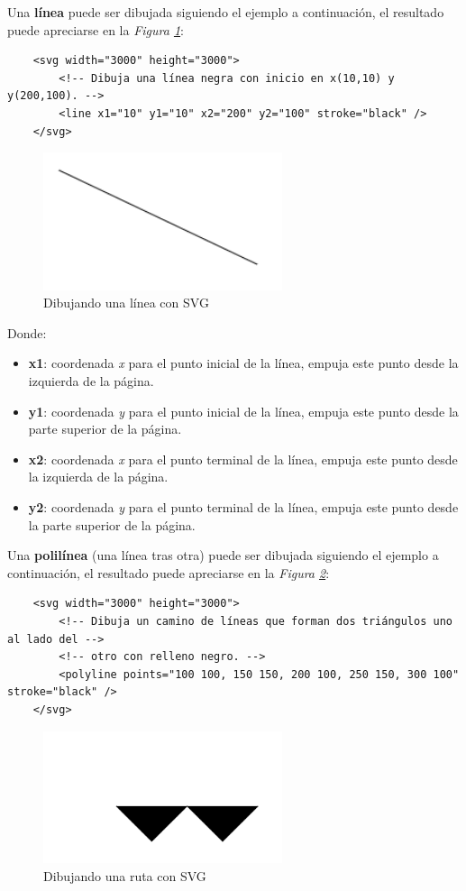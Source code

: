 Una \textbf{línea} puede ser dibujada siguiendo el ejemplo a continuación, el resultado puede apreciarse en la \textit{Figura \ref{fig: 22}}:
\begin{lstlisting}
    <svg width="3000" height="3000">
        <!-- Dibuja una línea negra con inicio en x(10,10) y y(200,100). -->
        <line x1="10" y1="10" x2="200" y2="100" stroke="black" />
    </svg>
\end{lstlisting}
\begin{figure}[H]
    \centering
    \caption{Dibujando una línea con SVG}
    \label{fig: 22}
    \includegraphics[width=7cm]{ss_html/svg_line.png}
\end{figure}

Donde:
\begin{itemize}
    \item \textbf{x1}: coordenada \textit{x} para el punto inicial de la línea, empuja este punto desde la izquierda de la página.
    \item \textbf{y1}: coordenada \textit{y} para el punto inicial de la línea, empuja este punto desde la parte superior de la página.
    \item \textbf{x2}: coordenada \textit{x} para el punto terminal de la línea, empuja este punto desde la izquierda de la página.
    \item \textbf{y2}: coordenada \textit{y} para el punto terminal de la línea, empuja este punto desde la parte superior de la página.
\end{itemize}

Una \textbf{polilínea} (una línea tras otra) puede ser dibujada siguiendo el ejemplo a continuación, el resultado puede apreciarse en la \textit{Figura \ref{fig: 23}}:
\begin{lstlisting}
    <svg width="3000" height="3000">
        <!-- Dibuja un camino de líneas que forman dos triángulos uno al lado del -->
        <!-- otro con relleno negro. -->
        <polyline points="100 100, 150 150, 200 100, 250 150, 300 100" stroke="black" />
    </svg>
\end{lstlisting}
\begin{figure}[H]
    \centering
    \caption{Dibujando una ruta con SVG}
    \label{fig: 23}
    \includegraphics[width=7cm]{ss_html/svg_polyline.png}
\end{figure}

